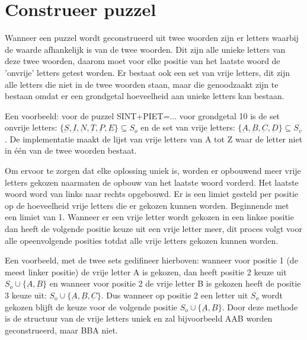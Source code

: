 \documentclass[twocolumn,10pt]{article}
\begin{document}
\section*{Construeer puzzel}
Wanneer een puzzel wordt geconstrueerd uit twee woorden zijn er letters waarbij de waarde afhankelijk is van de twee woorden. Dit zijn alle unieke letters van deze twee woorden, daarom moet voor elke positie van het laatste woord de 'onvrije' letters getest worden. Er bestaat ook een set van vrije letters, dit zijn alle letters die niet in de twee woorden staan, maar die genoodzaakt zijn te bestaan omdat er een grondgetal hoeveelheid aan unieke letters kan bestaan.

Een voorbeeld: voor de puzzel SINT+PIET=... voor grondgetal 10 is de set onvrije letters: $\{\underbar{S}, \underbar{I}, \underbar{N}, \underbar{T}, \underbar{P}, \underbar{E}\} \subseteq S_o$ en de set van vrije letters: $\{ \underbar{A}, \underbar{B}, \underbar{C}, \underbar{D} \} \subseteq S_v$. De implementatie maakt de lijst van vrije letters van A tot Z waar de letter niet in \'e\'en van de twee woorden bestaat.

Om ervoor te zorgen dat elke oplossing uniek is, worden er opbouwend meer vrije letters gekozen naarmaten de opbouw van het laatste woord vorderd. Het laatste woord word van links naar rechts opgebouwd. Er is een limiet gesteld per positie op de hoeveelheid vrije letters die er gekozen kunnen worden. Beginnende met een limiet van 1. Wanneer er een vrije letter wordt gekozen in een linkse positie dan heeft de volgende positie keuze uit een vrije letter meer, dit proces volgt voor alle opeenvolgende posities totdat alle vrije letters gekozen kunnen worden.

Een voorbeeld, met de twee sets gedifineer hierboven: wanneer voor positie 1 (de meest linker positie) de vrije letter A is gekozen, dan heeft positie 2 keuze uit $S_o \cup \{\underbar{A}, \underbar{B}\}$ en wanneer voor positie 2 de vrije letter B is gekozen heeft de positie 3 keuze uit: $S_o \cup \{\underbar{A}, \underbar{B}, \underbar{C}\}$. Dus wanneer op positie 2 een letter uit $S_o$ wordt gekozen blijft de keuze voor de volgende positie $S_o \cup \{\underbar{A}, \underbar{B}\}$. Door deze methode is de structuur van de vrije letters uniek en zal bijvoorbeeld AAB worden geconstrueerd, maar BBA niet.
\end{document}
